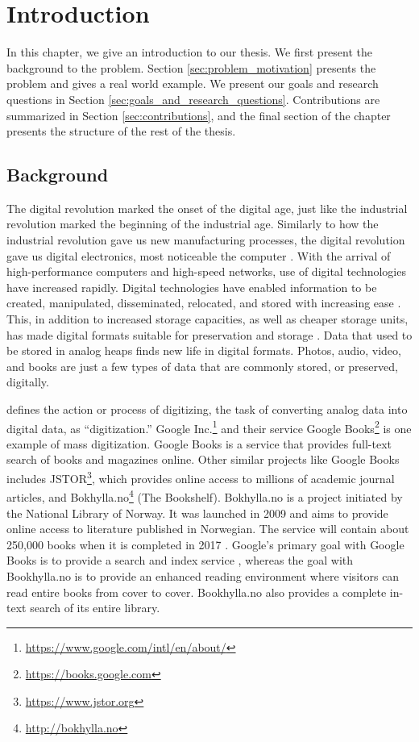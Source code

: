 
\chapter{Introduction}
\label{ch:introduction}
In this chapter, we give an introduction to our thesis. We first present the background to the problem. Section \ref{sec:problem_motivation} presents the problem and gives a real world example. We present our goals and research questions in Section \ref{sec:goals_and_research_questions}. Contributions are summarized in Section \ref{sec:contributions}, and the final section of the chapter presents the structure of the rest of the thesis.

\section{Background}
The digital revolution marked the onset of the digital age, just like the industrial revolution marked the beginning of the industrial age. Similarly to how the industrial revolution gave us new manufacturing processes, the digital revolution gave us digital electronics, most noticeable the computer \citep[chap.~9]{freeman2001time}. With the arrival of high-performance computers and high-speed networks, use of digital technologies have increased rapidly. Digital technologies have enabled information to be created, manipulated, disseminated, relocated, and stored with increasing ease \citep{lee2002state}. This, in addition to increased storage capacities, as well as cheaper storage units, has made digital formats suitable for preservation and storage \citep{morris2003evolution}. Data that used to be stored in analog heaps finds new life in digital formats. Photos, audio, video, and books are just a few types of data that are commonly stored, or preserved, digitally.

\cite{misc-oed-digitization} defines the action or process of digitizing, the task of converting analog data into digital data, as ``digitization.'' Google Inc.\footnote{\url{https://www.google.com/intl/en/about/}} and their service Google Books\footnote{\url{https://books.google.com}} is one example of mass digitization. Google Books is a service that provides full-text search of books and magazines online. Other similar projects like Google Books includes JSTOR\footnote{\url{https://www.jstor.org}}, which provides online access to millions of academic journal articles, and Bokhylla.no\footnote{\url{http://bokhylla.no}} (The Bookshelf). Bokhylla.no is a project initiated by the National Library of Norway. It was launched in 2009 and aims to provide online access to literature published in Norwegian. The service will contain about 250,000 books when it is completed in 2017 \citep{misc-nb-digial-library}. Google's primary goal with Google Books is to provide a search and index service \citep{coyle2006mass}, whereas the goal with Bookhylla.no is to provide an enhanced reading environment where visitors can read entire books from cover to cover. Bookhylla.no also provides a complete in-text search of its entire library. 

